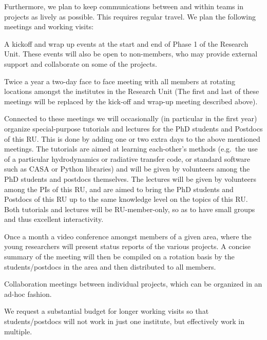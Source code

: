 \documentclass[10pt,fleqn,twoside]{article}
\begin{document}
Furthermore, we plan to keep communications between and within teams in
projects as lively as possible. This requires regular travel.
We plan the following meetings and working visits:
\begin{compactitemize}
\item A kickoff and wrap up events at the start and end of Phase 1 of the
  Research Unit. These events will also be open to non-members, who may
  provide external support and collaborate on some of the projects.
\item Twice a year a two-day face to face meeting with all members at
  rotating locations amongst the institutes in the Research Unit (The
  first and last of these meetings will be replaced by the kick-off
  and wrap-up meeting described above). 
\item Connected to these meetings we will occasionally (in particular in the
  first year) organize special-purpose tutorials and lectures for the PhD
  students and Postdocs of this RU. This is done by adding one or two extra
  days to the above mentioned meetings. The tutorials are aimed at learning
  each-other's methods (e.g.\ the use of a particular hydrodynamics or
  radiative transfer code, or standard software such as CASA or Python
  libraries) and will be given by volunteers among the PhD students and
  postdocs themselves. The lectures will be given by volunteers among the
  PIs of this RU, and are aimed to bring the PhD students and Postdocs of
  this RU up to the same knowledge level on the topics of this RU.  Both
  tutorials and lectures will be RU-member-only, so as to have small groups
  and thus excellent interactivity.
\item Once a month a video conference amongst members of a given area, where
  the young researchers will present status reports of the various
  projects. A concise summary of the meeting will then be compiled on a
  rotation basis by the students/postdocs in the area and then distributed
  to all members.
\item Collaboration meetings between individual projects, which can be 
  organized in an ad-hoc fashion.
\item We request a substantial budget for longer working visits so that
  students/postdocs will not work in just one institute, but effectively
  work in multiple.
\end{compactitemize}


\end{document}
